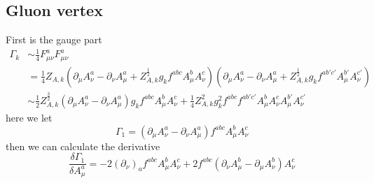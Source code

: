 \documentclass[UTF8]{article}
\begin{document}
\subsection{Gluon vertex}
First is the gauge part
\begin{equation}
\begin{split}
\Gamma_k&\sim\frac{1}{4}F^{a}_{\mu\nu}F^{a}_{\mu\nu}\\
&=\frac{1}{4}Z_{A,k}(\partial_\mu A^{a}_{\nu}-\partial_\nu A^{a}_{\mu}+Z_{A,k}^{\frac{1}{2}}g_kf^{abc}A^b_\mu A^c_\nu)(\partial_\mu A^{a}_{\nu}-\partial_\nu 
A^{a}_{\mu}+Z_{A,k}^{\frac{1}{2}}g_kf^{ab'c'}A^{b'}_\mu A^{c'}_\nu)\\
&\sim \frac{1}{2}Z^{\frac{3}{2}}_{A,k}(\partial_\mu A^{a}_{\nu}-\partial_\nu A^{a}_{\mu})g_kf^{abc}A^{b}_{\mu}A^{c}_{\nu}+\frac{1}{4}Z^{2}_{A,k}g^{2}_{k}
f^{abc}f^{ab'c'}A^{b}_{\mu}A^{c}_{\nu}A^{b'}_\mu A^{c'}_\nu
\end{split}
\end{equation}
here we let
\begin{equation}
\Gamma_1=(\partial_\mu A^{a}_{\nu}-\partial_\nu A^{a}_{\mu})f^{abc}A^{b}_{\mu}A^{c}_{\nu}
\end{equation}
then we can calculate the derivative
\begin{equation}
\frac{\delta\Gamma_1}{\delta A^{a}_{\mu}}=-2(\partial_\nu)_af^{abc}A^{b}_{\mu}A^{c}_{\nu}+2f^{abc}(\partial_\nu A^{b}_{\mu}-\partial_\mu A^{b}_{\nu})
A^{c}_{\nu}
\end{equation}
\end{document}
